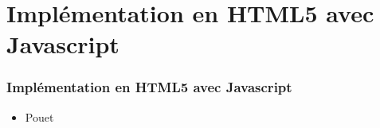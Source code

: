 \section{Implémentation en HTML5 avec Javascript}
  \begin{frame}
    \frametitle{Implémentation en HTML5 avec Javascript}
    \begin{itemize}
      \item Pouet
    \end{itemize}
  \end{frame}


